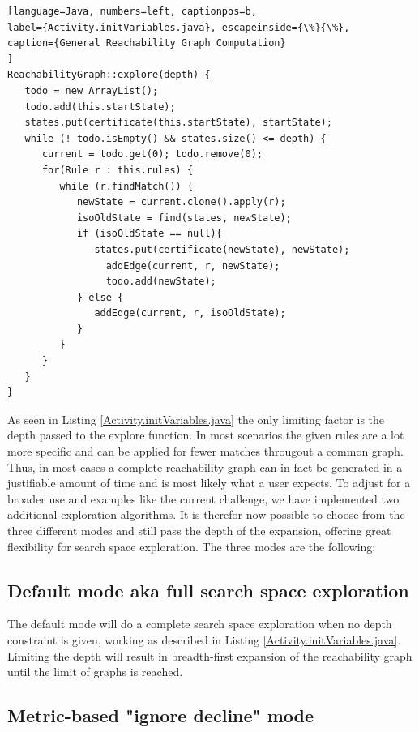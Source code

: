 \documentclass[submission,copyright,creativecommons]{eptcs}
\begin{document}
\begin{lstlisting}[language=Java, numbers=left, captionpos=b, 
label={Activity.initVariables.java}, escapeinside={\%}{\%},
caption={General Reachability Graph Computation}
]
ReachabilityGraph::explore(depth) {
   todo = new ArrayList();
   todo.add(this.startState);
   states.put(certificate(this.startState), startState);
   while (! todo.isEmpty() && states.size() <= depth) {
      current = todo.get(0); todo.remove(0);
      for(Rule r : this.rules) {
         while (r.findMatch()) {
            newState = current.clone().apply(r);
            isoOldState = find(states, newState);
            if (isoOldState == null){
               states.put(certificate(newState), newState);
            	 addEdge(current, r, newState);
             	 todo.add(newState);
            } else {
               addEdge(current, r, isoOldState);
            }
         }
      }
   }
}

\end{lstlisting}

As seen in Listing \ref{Activity.initVariables.java} the only limiting factor 
is the depth passed to the explore function. In most scenarios the given rules 
are a lot more specific and can be applied for fewer matches througout a common 
graph. Thus, in most cases a complete reachability graph can in fact be 
generated in a justifiable amount of time and is most likely what a user 
expects. To adjust for a broader use and examples like the current challenge, 
we have implemented two additional exploration algorithms. It is therefor now 
possible to choose from the three different modes and still pass the depth of 
the expansion, offering great flexibility for search space exploration. The 
three modes are the following:

\subsection{Default mode aka full search space exploration}

The default mode will do a complete search space exploration when no depth 
constraint is given, working as described in Listing 
\ref{Activity.initVariables.java}. Limiting the depth will result in 	
breadth-first expansion of the reachability graph until the limit of graphs is 
reached.

\subsection{Metric-based "ignore decline" mode}
\end{document}
